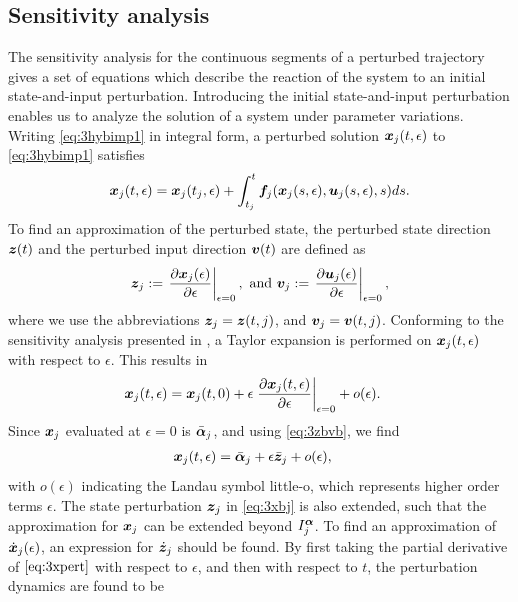 \documentclass[../DC2017114Bouma.tex]{subfiles}
\begin{document}
\subsection{Sensitivity analysis}\label{sec:3sens}
The sensitivity analysis for the continuous segments of a perturbed trajectory gives a set of equations which describe the reaction of the system to an initial state-and-input perturbation. Introducing the initial state-and-input perturbation enables us to analyze the solution of a system under parameter variations. Writing \eqref{eq:3hybimp1} in integral form, a perturbed solution ${\boldsymbol{x}}_j(t,\epsilon)$ to \eqref{eq:3hybimp1} satisfies
\begin{align}
{\boldsymbol{x}}_j(t,\epsilon) = {\boldsymbol{x}}_j(t_j,\epsilon) + \int_{t_j}^{t}{\boldsymbol{f}}_j({\boldsymbol{x}}_j(s,\epsilon),{\boldsymbol{u}}_j(s,\epsilon),s)ds.\label{eq:3xpert}
\end{align}
To find an approximation of the perturbed state, the perturbed state direction ${\boldsymbol{z}}(t)$ and the perturbed input direction ${\boldsymbol{v}}(t)$ are defined as
\begin{align}
{\boldsymbol{z}}_j := \left.\frac{\partial{\boldsymbol{x}}_j(\epsilon)}{\partial\epsilon}\right|_{\epsilon=0},\text{ and } {\boldsymbol{v}}_j := \left.\frac{\partial{\boldsymbol{u}}_j(\epsilon)}{\partial\epsilon}\right|_{\epsilon=0},\label{eq:3zbvb}
\end{align}
where we use the abbreviations ${\boldsymbol{z}}_j = {\boldsymbol{z}}(t,j)$, and ${\boldsymbol{v}}_j = {\boldsymbol{v}}(t,j)$. Conforming to the sensitivity analysis presented in \cite{Khalil1996}, a Taylor expansion is performed on ${\boldsymbol{x}}_j(t,\epsilon)$ with respect to $\epsilon$. This results in
\begin{align}
{\boldsymbol{x}}_j(t,\epsilon) &= {\boldsymbol{x}}_j(t,0) + \epsilon\left.\frac{\partial{\boldsymbol{x}}_j(t,\epsilon)}{\partial\epsilon}\right|_{\epsilon=0} + o(\epsilon).\label{eq:3taylor}
\end{align}
Since ${\boldsymbol{x}}_j$ evaluated at $\epsilon=0$ is $\bar{\boldsymbol{\alpha}}_j$, and using \eqref{eq:3zbvb}, we find
\begin{align}
{\boldsymbol{x}}_j(t,\epsilon) &= \bar{\boldsymbol{\alpha}}_j + \epsilon\bar{{\boldsymbol{z}}}_j + o(\epsilon),\label{eq:3xbj}
\end{align}
with $o(\epsilon)$ indicating the Landau symbol little-o, which represents higher order terms $\epsilon$. The state perturbation ${\boldsymbol{z}}_j$ in \eqref{eq:3xbj} is also extended, such that the approximation for ${\boldsymbol{x}}_j$ can be extended beyond $I_j^{\boldsymbol{\alpha}}$. To find an approximation of $\dot{{\boldsymbol{x}}}_j(\epsilon)$, an expression for $\dot{{\boldsymbol{z}}}_j$ should be found. By first taking the partial derivative of $\eqref{eq:3xpert}$ with respect to $\epsilon$, and then with respect to $t$, the perturbation dynamics are found to be
\end{document}
